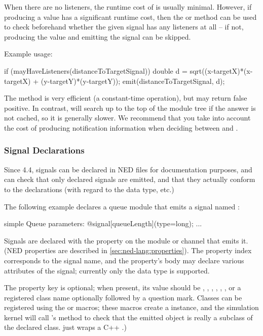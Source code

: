 When there are no listeners, the runtime cost of  is usually minimal.
However, if producing a value has a significant runtime cost, then the
 or  method can be used
to check beforehand whether the given signal has any listeners at all --
if not, producing the value and emitting the signal can be skipped.

Example usage:

\begin{cpp}
if (mayHaveListeners(distanceToTargetSignal)) {
    double d = sqrt((x-targetX)*(x-targetX) + (y-targetY)*(y-targetY));
    emit(distanceToTargetSignal, d);
}
\end{cpp}

The  method is very efficient (a constant-time
operation), but may return false positive. In contrast,
 will search up to the top of the module tree if
the answer is not cached, so it is generally slower. We recommend that
you take into account the cost of producing notification information when
deciding between  and .


\subsubsection{Signal Declarations}
\label{sec:simple-modules:signal-declarations}

Since {\opp} 4.4, signals can be declared in NED files for documentation
purposes, and {\opp} can check that only declared signals are emitted,
and that they actually conform to the declarations (with regard to the
data type, etc.)

The following example declares a queue module that emits a signal named
:

\begin{ned}
simple Queue
{
    parameters:
        @signal[queueLength](type=long);
        ...
}
\end{ned}

Signals are declared with the  property on
the module or channel that emits it. (NED properties are described in
\ref{sec:ned-lang:properties}). The property index corresponds
to the signal name, and the property's body may declare various attributes
of the signal; currently only the data type is supported.

The  property key is optional; when present, its value should be
, , , , ,
, or a registered class name optionally followed by a question
mark. Classes can be registered using the  or
 macros; these macros create a
 instance, and the simulation kernel will call
's  method to check that the
emitted object is really a subclass of the declared class.
 just wraps a C++ .)

